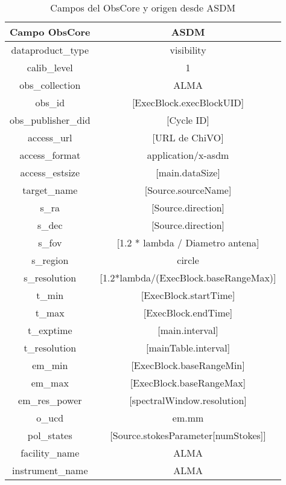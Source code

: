 \begin{table}[h!t]
    \centering
    \begin{tabular}{|c|c|}
        \hline
        \textbf{Campo ObsCore} & ASDM \\
        \hline
        dataproduct\_type      & visibility \\
        calib\_level           & 1 \\
        obs\_collection        & ALMA \\
        obs\_id                & [ExecBlock.execBlockUID] \\
        obs\_publisher\_did    & [Cycle ID] \\
        access\_url            & [URL de ChiVO] \\
        access\_format         & application/x-asdm \\
        access\_estsize        & [main.dataSize] \\
        target\_name           & [Source.sourceName] \\
        s\_ra                  & [Source.direction] \\
        s\_dec                 & [Source.direction] \\
        s\_fov                 & [1.2 * lambda / Diametro antena] \\
        s\_region              & circle \\
        s\_resolution          & [1.2*lambda/(ExecBlock.baseRangeMax)] \\
        t\_min                 & [ExecBlock.startTime] \\
        t\_max                 & [ExecBlock.endTime] \\
        t\_exptime             & [main.interval] \\
        t\_resolution          & [mainTable.interval] \\
        em\_min                & [ExecBlock.baseRangeMin] \\
        em\_max                & [ExecBlock.baseRangeMax] \\
        em\_res\_power         & [spectralWindow.resolution] \\
        o\_ucd                 & em.mm \\
        pol\_states            & [Source.stokesParameter[numStokes]] \\
        facility\_name         & ALMA \\
        instrument\_name       & ALMA \\
        \hline
    \end{tabular}
    \caption{Campos del ObsCore y origen desde ASDM}
    \label{table:obsasdm}
\end{table}

